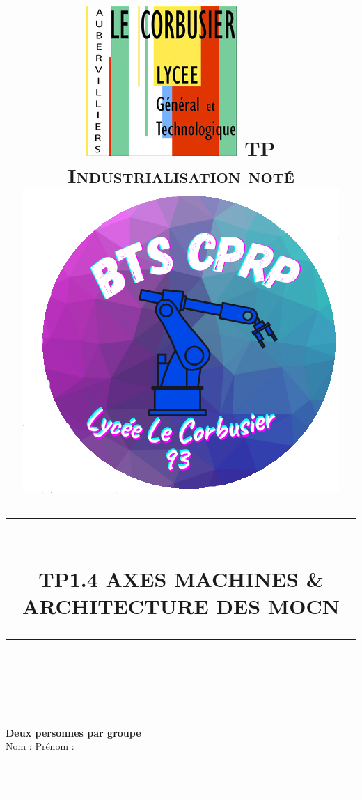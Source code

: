 \documentclass[12pt]{article}
\newcommand{\HRule}[1]{\rule{\linewidth}{#1}}
\begin{document}
 
\title{ \includegraphics[width=0.18\linewidth]{corbu.jpg} \hspace{2cm} \normalsize \textsc{TP Industrialisation noté \hspace{2cm} \includegraphics[width=0.2\linewidth]{btscprp.png}}
		\\ [2.0cm]
		\HRule{0.5pt} \\
		\LARGE \textbf{\uppercase{TP1.4 Axes Machines \& architecture des MOCN}}
		\HRule{2pt} \\ [0.5cm]}
\maketitle

\textbf{Deux personnes par groupe}\\


Nom :  \hspace{5cm} Prénom : \\


\vspace{1cm}

-----------------------------------  \hspace{1cm}   ---------------------------------

\vspace{1cm}

-----------------------------------  \hspace{1cm}   ---------------------------------




\sectionfont{\scshape}




\newpage



\end{document}
